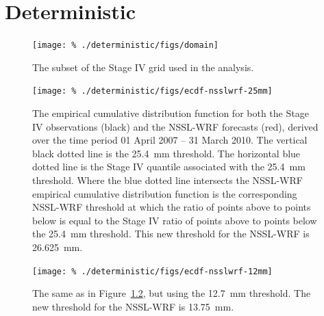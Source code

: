 

\chapter{Deterministic}
\label{deterministic}









\clearpage
\begin{figure}[cc]
    \centering
    \texttt{[image: \%
    ./deterministic/figs/domain]}\\
    \caption{The subset of the Stage IV grid used in the analysis.}
    \label{domain}
\end{figure}


\clearpage
\begin{figure}[cc]
    \centering
    \texttt{[image: \%
    ./deterministic/figs/ecdf-nsslwrf-25mm]}\\
    \caption{The empirical cumulative distribution function for both the Stage IV observations (black) and the NSSL-WRF forecasts (red), derived over the time period 01 April 2007 -- 31 March 2010.
    The vertical black dotted line is the \mbox{25.4 mm} threshold.
    The horizontal blue dotted line is the Stage IV quantile associated with the \mbox{25.4 mm} threshold.
    Where the blue dotted line intersects the NSSL-WRF empirical cumulative distribution function is the corresponding NSSL-WRF threshold at which the ratio of points above to points below is equal to the Stage IV ratio of points above to points below the \mbox{25.4 mm} threshold.
    This new threshold for the NSSL-WRF is \mbox{26.625 mm}.}
    \label{single_25quant}
\end{figure}


\clearpage
\begin{figure}[cc]
    \centering
    \texttt{[image: \%
    ./deterministic/figs/ecdf-nsslwrf-12mm]}\\
    \caption{The same as in \mbox{Figure \ref{single_25quant}}, but using the \mbox{12.7 mm} threshold.
    The new threshold for the NSSL-WRF is \mbox{13.75 mm}.}
    \label{single_12quant}
\end{figure}


